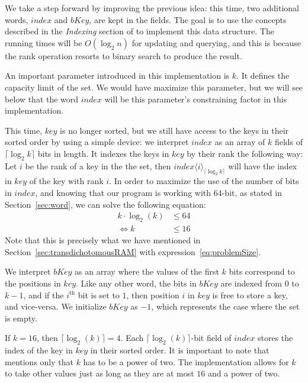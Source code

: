 We take a step forward by improving the previous idea: this time, two additional words, $index$ and $bKey$, are kept in the fields. The goal is to use the concepts described in the \textit{Indexing} section of \cite{patrascu2014dynamic} to implement this data structure. The running times will be $O(\log_2 n)$ for updating and querying, and this is because the rank operation resorts to binary search to produce the result.

An important parameter introduced in this implementation is $k$. It defines the capacity limit of the set. We would have maximize this parameter, but we will see below that the word $index$ will be this parameter's constraining factor in this implementation.

This time, $key$ is no longer sorted, but we still have access to the keys in their sorted order by using a simple device: we interpret $index$ as an array of $k$ fields of $\lceil \log_2 k \rceil$ bits in length. It indexes the keys in $key$ by their rank the following way: Let $i$ be the rank of a key in the the set, then $index\langle i\rangle_{\lceil \log_2 k \rceil}$ will have the index in $key$ of the key with rank $i$.
In order to maximize the use of the number of bits in $index$, and knowing that our program is working with 64-bit, as stated in Section~\ref{sec:word}, we can solve the following equation:
\begin{align*}
    k \cdot \log_2(k) &\leq 64 \\
    \iff k &\leq 16
\end{align*}
Note that this is precisely what we have mentioned in Section~\ref{sec:transdichotomousRAM} with expression~\ref{eq:problemSize}.

We interpret $bKey$ as an array where the values of the first $k$ bits correspond to the positions in $key$. Like any other word, the bits in $bKey$ are indexed from $0$ to $k-1$, and if the $i^{\text{th}}$ bit is set to $1$, then position $i$ in $key$ is free to store a key, and vice-versa. We initialize $bKey$ as $-1$, which represents the case where the set is empty.

If $k = 16$, then $\lceil \log_2(k) \rceil = 4$. Each $\lceil \log_2(k) \rceil$-bit field of $index$ stores the index of the key in $key$ in their sorted order.
It is important to note that \cite{patrascu2014dynamic} mentions only that $k$ has to be a power of two. The implementation allows for $k$ to take other values just as long as they are at most $16$ and a power of two.

